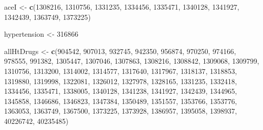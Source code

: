 \documentclass[
  11pt]{book}
\newenvironment{Shaded}{\begin{snugshade}}{\end{snugshade}}
\newcommand{\DecValTok}[1]{\textcolor[rgb]{0.00,0.00,0.81}{#1}}
\newcommand{\FunctionTok}[1]{\textcolor[rgb]{0.13,0.29,0.53}{\textbf{#1}}}
\newcommand{\NormalTok}[1]{#1}
\newcommand{\OtherTok}[1]{\textcolor[rgb]{0.56,0.35,0.01}{#1}}
\theoremstyle{definition}
\theoremstyle{definition}
\theoremstyle{definition}
\theoremstyle{definition}
\theoremstyle{remark}
\begin{document}
\begin{Shaded}
\begin{Highlighting}[]
\NormalTok{aceI }\OtherTok{\textless{}{-}} \FunctionTok{c}\NormalTok{(}\DecValTok{1308216}\NormalTok{, }\DecValTok{1310756}\NormalTok{, }\DecValTok{1331235}\NormalTok{, }\DecValTok{1334456}\NormalTok{, }\DecValTok{1335471}\NormalTok{, }\DecValTok{1340128}\NormalTok{, }\DecValTok{1341927}\NormalTok{,}
          \DecValTok{1342439}\NormalTok{, }\DecValTok{1363749}\NormalTok{, }\DecValTok{1373225}\NormalTok{)}

\NormalTok{hypertension }\OtherTok{\textless{}{-}} \DecValTok{316866}

\NormalTok{allHtDrugs }\OtherTok{\textless{}{-}} \FunctionTok{c}\NormalTok{(}\DecValTok{904542}\NormalTok{, }\DecValTok{907013}\NormalTok{, }\DecValTok{932745}\NormalTok{, }\DecValTok{942350}\NormalTok{, }\DecValTok{956874}\NormalTok{, }\DecValTok{970250}\NormalTok{, }\DecValTok{974166}\NormalTok{,}
                  \DecValTok{978555}\NormalTok{, }\DecValTok{991382}\NormalTok{, }\DecValTok{1305447}\NormalTok{, }\DecValTok{1307046}\NormalTok{, }\DecValTok{1307863}\NormalTok{, }\DecValTok{1308216}\NormalTok{,}
                  \DecValTok{1308842}\NormalTok{, }\DecValTok{1309068}\NormalTok{, }\DecValTok{1309799}\NormalTok{, }\DecValTok{1310756}\NormalTok{, }\DecValTok{1313200}\NormalTok{, }\DecValTok{1314002}\NormalTok{,}
                  \DecValTok{1314577}\NormalTok{, }\DecValTok{1317640}\NormalTok{, }\DecValTok{1317967}\NormalTok{, }\DecValTok{1318137}\NormalTok{, }\DecValTok{1318853}\NormalTok{, }\DecValTok{1319880}\NormalTok{,}
                  \DecValTok{1319998}\NormalTok{, }\DecValTok{1322081}\NormalTok{, }\DecValTok{1326012}\NormalTok{, }\DecValTok{1327978}\NormalTok{, }\DecValTok{1328165}\NormalTok{, }\DecValTok{1331235}\NormalTok{,}
                  \DecValTok{1332418}\NormalTok{, }\DecValTok{1334456}\NormalTok{, }\DecValTok{1335471}\NormalTok{, }\DecValTok{1338005}\NormalTok{, }\DecValTok{1340128}\NormalTok{, }\DecValTok{1341238}\NormalTok{,}
                  \DecValTok{1341927}\NormalTok{, }\DecValTok{1342439}\NormalTok{, }\DecValTok{1344965}\NormalTok{, }\DecValTok{1345858}\NormalTok{, }\DecValTok{1346686}\NormalTok{, }\DecValTok{1346823}\NormalTok{,}
                  \DecValTok{1347384}\NormalTok{, }\DecValTok{1350489}\NormalTok{, }\DecValTok{1351557}\NormalTok{, }\DecValTok{1353766}\NormalTok{, }\DecValTok{1353776}\NormalTok{, }\DecValTok{1363053}\NormalTok{,}
                  \DecValTok{1363749}\NormalTok{, }\DecValTok{1367500}\NormalTok{, }\DecValTok{1373225}\NormalTok{, }\DecValTok{1373928}\NormalTok{, }\DecValTok{1386957}\NormalTok{, }\DecValTok{1395058}\NormalTok{,}
                  \DecValTok{1398937}\NormalTok{, }\DecValTok{40226742}\NormalTok{, }\DecValTok{40235485}\NormalTok{)}
\end{Highlighting}
\end{Shaded}
\end{document}
